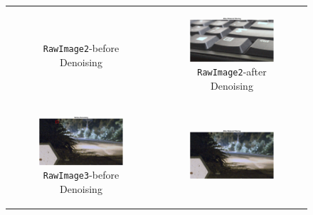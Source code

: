 \documentclass[11pt, a4]{article}
\begin{document}
\begin{enumerate}
\begin{figure}[H]
{\begin{tabular}{cc}
\begin{subfigure}[h]{0.45\linewidth}
							\caption{\texttt{RawImage2}-before Denoising}
							\label{fig:RawImage2_denoising_1}
						\end{subfigure} &
						\begin{subfigure}[h]{0.45\linewidth}
							\centering
							\includegraphics[width=\linewidth]{../output/RawImage2_after_denoising.pdf}
							\caption{\texttt{RawImage2}-after Denoising}
							\label{fig:RawImage2_denoising_2}
						\end{subfigure}\\
						\begin{subfigure}[h]{0.45\linewidth}
						\centering
						\includegraphics[width=\linewidth]{../output/RawImage3_before_denoising.pdf}
						\caption{\texttt{RawImage3}-before Denoising}
						\label{fig:RawImage3_denoising_1}
						\end{subfigure} &
						\begin{subfigure}[h]{0.45\linewidth}
						\centering
						\includegraphics[width=\linewidth]{../output/RawImage3_after_denoising.pdf}

\end{subfigure}
\end{tabular}}
\end{figure}
\end{enumerate}
\end{document}
